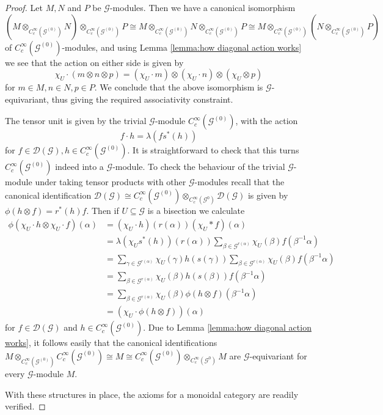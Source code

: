 \documentclass{amsart}
\newcommand{\G}{\mathcal{G}}
\newcommand{\DG}{\mathcal{D}(\mathcal{G})}
\newcommand{\ccinfty}{C_c^\infty}
\begin{document}
\begin{proof}
Let $ M, N $ and $ P $ be $ \G $-modules. Then we have a canonical isomorphism 
$$ 
(M\otimes_{\ccinfty(\G^{(0)})} N) \otimes_{\ccinfty(\G^{(0)})} P 
\cong M \otimes_{\ccinfty(\G^{(0)})} N \otimes_{\ccinfty(\G^{(0)})} P 
\cong M \otimes_{\ccinfty(\G^{(0)})} (N\otimes_{\ccinfty(\G^{(0)})} P) 
$$ 
of $ \ccinfty(\G^{(0)}) $-modules, and using Lemma \ref{lemma:how diagonal action works} we see that the action on either side is given by 
$$
\chi_U \cdot(m \otimes n \otimes p) = (\chi_U \cdot m) \otimes (\chi_U \cdot n) \otimes (\chi_U \otimes p) 
$$
for $ m \in M, n \in N, p \in P $. We conclude that the above isomorphism is $ \G $-equivariant, thus giving the required associativity constraint. 

The tensor unit is given by the trivial $ \G $-module $ \ccinfty(\G^{(0)}) $, with the action 
$$ 
f \cdot h = \lambda(f s^*(h)) 
$$ 
for $ f \in \DG, h \in \ccinfty(\G^{(0)}) $. It is straightforward to check that this turns $ \ccinfty(\G^{(0)}) $ indeed into a $ \G $-module. To check the behaviour of the trivial $ \G $-module under taking tensor products with other $ \G $-modules recall that the canonical identification $ \DG \cong  \ccinfty(\G^{(0)}) \otimes_{\ccinfty(\G^0)} \DG $ is given by $ \phi(h \otimes f) = r^*(h) f $. Then if $ U \subseteq \G $ is a bisection we calculate
\begin{align*}
\phi(\chi_U \cdot h \otimes \chi_U \cdot f)(\alpha) &= (\chi_U \cdot h)(r(\alpha)) (\chi_U * f)(\alpha) \\
&= \lambda(\chi_U s^*(h))(r(\alpha)) \sum_{\beta \in \G^{r(\alpha)}} \chi_U(\beta) f(\beta^{-1} \alpha) \\
&= \sum_{\gamma \in \G^{r(\alpha)}} \chi_U(\gamma) h(s(\gamma)) \sum_{\beta \in \G^{r(\alpha)}} \chi_U(\beta) f(\beta^{-1} \alpha) \\
&= \sum_{\beta \in \G^{r(\alpha)}} \chi_U(\beta) h(s(\beta)) f(\beta^{-1} \alpha) \\
&= \sum_{\beta \in \G^{r(\alpha)}} \chi_U(\beta) \phi(h \otimes f)(\beta^{-1} \alpha) \\
&=(\chi_U \cdot \phi(h \otimes f))(\alpha)
\end{align*}
for $ f \in \DG $ and $ h \in \ccinfty(\G^{(0)}) $. 
Due to Lemma \ref{lemma:how diagonal action works}, it follows easily that the canonical identifications $ M \otimes_{\ccinfty(\G^{(0)})} \ccinfty(\G^{(0)}) \cong M \cong  \ccinfty(\G^{(0)}) \otimes_{\ccinfty(\G^0)} M $ are $ \G $-equivariant for every $ \G $-module $ M $. 

With these structures in place, the axioms for a monoidal category are readily verified. 
\end{proof}
\end{document}
